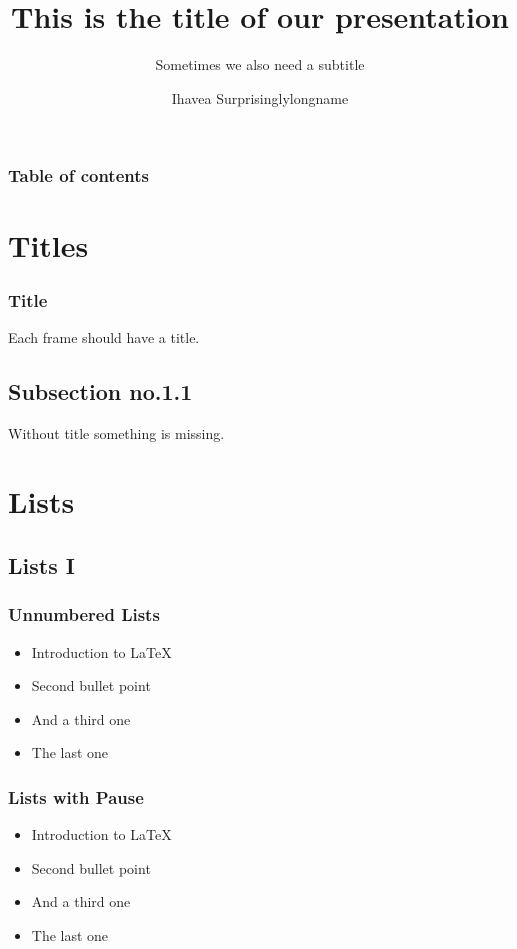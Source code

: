 \documentclass{beamer}
\title{This is the title of our presentation}
\author{Ihavea Surprisinglylongname}
\institute
{
  Lehrstuhl für Datenverarbeitung\\
}
\subtitle{Sometimes we also need a subtitle}
\begin{document}
\begin{frame}
	\titlepage
\end{frame}

\begin{frame}
   \frametitle{Table of contents}
   \tableofcontents[subsectionstyle=hide]
\end{frame} 

\section{Titles} 
\begin{frame}
   \frametitle{Title} 
   Each frame should have a title.
\end{frame}



\subsection{Subsection no.1.1  }
\begin{frame} 
   Without title something is missing. 
\end{frame}



\section{Lists} 
\subsection{Lists I}
\begin{frame}
   \frametitle{Unnumbered Lists}
   \begin{itemize}
      \item Introduction to  \LaTeX  
      \item Second bullet point 
      \item And a third one
      \item The last one
   \end{itemize} 
\end{frame}



\begin{frame}\frametitle{Lists with Pause}
   \begin{itemize}
      \item Introduction to  \LaTeX \pause 
      \item Second bullet point \pause 
      \item And a third one \pause 
      \item The last one
   \end{itemize} 
\end{frame}
\end{document}
